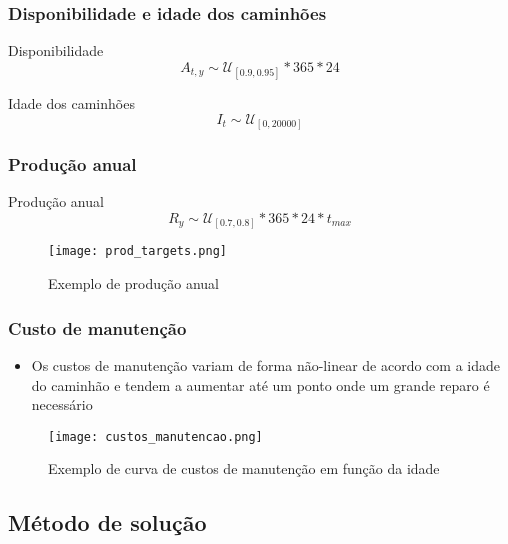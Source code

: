 \documentclass{beamer}
\begin{document}
\begin{frame}
	\frametitle{Disponibilidade e idade dos caminhões}
	\begin{block}{Disponibilidade}
		\begin{equation}
			A_{t,y} \sim \mathcal{U}_{[0.9, 0.95]} * 365 * 24
			\label{eq:disp}
		\end{equation}
	\end{block}

	\begin{block}{Idade dos caminhões}
		\begin{equation}
			I_{t} \sim \mathcal{U}_{[0, 20000]} 
			\label{eq:it}
		\end{equation}
	\end{block}
\end{frame}

\begin{frame}
	\frametitle{Produção anual}
	\begin{block}{Produção anual}
		\begin{equation}
			R_y \sim \mathcal{U}_{[0.7, 0.8]} * 365 * 24 * t_{max}
			\label{eq:prod}
		\end{equation}
	\end{block}

	\begin{figure}[h!]
		\centering
		\texttt{[image: prod\_targets.png]}
		\caption{Exemplo de produção anual}
		\label{fig:prod_targets}
	\end{figure}
\end{frame}

\begin{frame}
	\frametitle{Custo de manutenção}
	\begin{itemize}
		\item Os custos de manutenção variam de forma não-linear de acordo com a idade do caminhão e tendem a aumentar até um ponto onde um grande reparo é necessário \cite{nakousi2018}
	\end{itemize}	

	\begin{figure}[h!]
		\centering
		\texttt{[image: custos\_manutencao.png]}
		\caption{Exemplo de curva de custos de manutenção em função da idade}
		\label{fig:custo_manut}
	\end{figure}

\end{frame}

\subsection{Método de solução}
\end{document}
